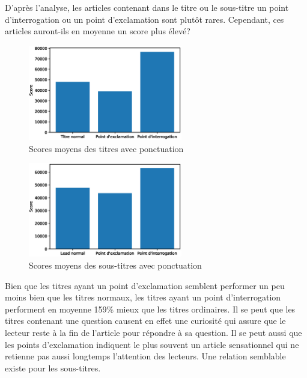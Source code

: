 \documentclass[french]{article}
\begin{document}
D'après l'analyse, les articles contenant dans le titre ou le sous-titre un point d'interrogation ou un point d'exclamation sont plutôt rares. Cependant, ces articles auront-ils en moyenne un score plus élevé?

\begin{figure}[H]
    \centering
    \includegraphics[width=0.6\textwidth]{bar_score_titres_ponctuation.eps}
    \caption{Scores moyens des titres avec ponctuation}
    \label{fig:bar_score_titres_ponctuation}
    \end{figure}

\begin{figure}[H]
    \centering
    \includegraphics[width=0.6\textwidth]{bar_score_leads_ponctuation.eps}
    \caption{Scores moyens des sous-titres avec ponctuation}
    \label{fig:bar_score_leads_ponctuation}
    \end{figure}
    

Bien que les titres ayant un point d'exclamation semblent performer un peu moins bien que les titres normaux, les titres ayant un point d'interrogation performent en moyenne 159\% mieux que les titres ordinaires. Il se peut que les titres contenant une question causent en effet une curiosité qui assure que le lecteur reste à la fin de l'article pour répondre à sa question. Il se peut aussi que les points d'exclamation indiquent le plus souvent un article sensationnel qui ne retienne pas aussi longtemps l'attention des lecteurs. Une relation semblable existe pour les sous-titres.
\end{document}
